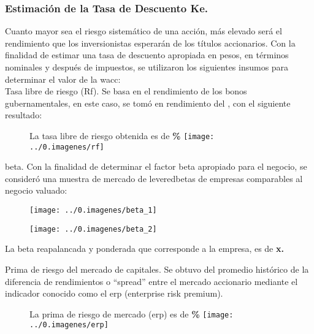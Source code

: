 \subsubsection{Estimaci\'on de la Tasa de Descuento Ke.}

Cuanto mayor sea el riesgo sistem\'atico de una acci\'on, m\'as elevado ser\'a el rendimiento que los inversionistas esperar\'an de los t\'itulos accionarios. Con la finalidad de estimar una tasa de descuento apropiada en pesos, en t\'erminos nominales y despu\'es de impuestos, se utilizaron los siguientes insumos para determinar el valor de la \gls{wacc}:\\


\textcolor{principal}{Tasa libre de riesgo (Rf).} Se basa en el rendimiento de los bonos gubernamentales, en este caso, se tom\'o en rendimiento del \textcolor{principal}{\rfBase}, con el siguiente resultado:

\begin{figure}[H]
\centering
La tasa libre de riesgo obtenida es de \textbf{\rfValor\%} \texttt{[image: ../0.imagenes/rf]}
\end{figure}

\gls{beta}. Con la finalidad de determinar el factor \gls{beta} apropiado para el negocio, se consider\'o una muestra de mercado de \glspl{leveredbeta} de empresas comparables al negocio valuado:

\espacio{4cm}
\begin{figure}[H]
\centering
\texttt{[image: ../0.imagenes/beta\_1]}\\
\end{figure}


\begin{figure}[H]
\centering
\texttt{[image: ../0.imagenes/beta\_2]}
\end{figure}


La beta reapalancada y ponderada que corresponde a la empresa, es de \textcolor{principal}{\textbf{\valorBeta x.}}\\

\newpage



\textcolor{principal}{Prima de riesgo del mercado de capitales}. Se obtuvo del promedio hist\'orico de la diferencia de rendimientos o ``spread'' entre el mercado accionario \mercadoAccionario mediante el indicador conocido como el \gls{erp} (enterprise risk premium).\\

\begin{figure}[H]
\centering
La prima de riesgo de mercado (\gls{erp}) es de \textbf{\textcolor{principal}{\erpValor\%}} \texttt{[image: ../0.imagenes/erp]}
\end{figure}

